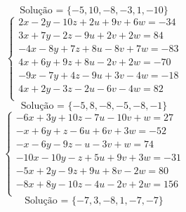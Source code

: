 \documentclass[12pt,oneside,a4paper]{article}
\begin{document}
\begin{equation*}
\text{Solução = }\{-5,10,-8,-3,1,-10\}
\end{equation*}
\vspace{\baselineskip}
\begin{equation*}
\begin{cases}
2x-2y-10z+2u+9v+6w=-34 \\
3x+7y-2z-9u+2v+2w=84 \\
-4x-8y+7z+8u-8v+7w=-83 \\
4x+6y+9z+8u-2v+2w=-70 \\
-9x-7y+4z-9u+3v-4w=-18 \\
4x+2y-3z-2u-6v-4w=82 \\
\end{cases}
\end{equation*}
\begin{equation*}
\text{Solução = }\{-5,8,-8,-5,-8,-1\}
\end{equation*}
\vspace{\baselineskip}
\begin{equation*}
\begin{cases}
-6x+3y+10z-7u-10v+w=27 \\
-x+6y+z-6u+6v+3w=-52 \\
-x-6y-9z-u-3v+w=74 \\
-10x-10y-z+5u+9v+3w=-31 \\
-5x+2y-9z+9u+8v-2w=80 \\
-8x+8y-10z-4u-2v+2w=156 \\
\end{cases}
\end{equation*}
\begin{equation*}
\text{Solução = }\{-7,3,-8,1,-7,-7\}
\end{equation*}
\vspace{\baselineskip}
\end{document}
